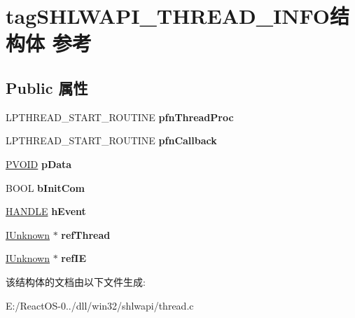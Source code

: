 \hypertarget{structtag_s_h_l_w_a_p_i___t_h_r_e_a_d___i_n_f_o}{}\section{tag\+S\+H\+L\+W\+A\+P\+I\+\_\+\+T\+H\+R\+E\+A\+D\+\_\+\+I\+N\+F\+O结构体 参考}
\label{structtag_s_h_l_w_a_p_i___t_h_r_e_a_d___i_n_f_o}
\subsection*{Public 属性}
\begin{DoxyCompactItemize}
\item 
\mbox{\label{structtag_s_h_l_w_a_p_i___t_h_r_e_a_d___i_n_f_o_a1efacbeb69d12b0a4964fd877233ce87}} 
L\+P\+T\+H\+R\+E\+A\+D\+\_\+\+S\+T\+A\+R\+T\+\_\+\+R\+O\+U\+T\+I\+NE {\bfseries pfn\+Thread\+Proc}
\item 
\mbox{\label{structtag_s_h_l_w_a_p_i___t_h_r_e_a_d___i_n_f_o_adb1f887bf04e0d3e54d162e7953a323a}} 
L\+P\+T\+H\+R\+E\+A\+D\+\_\+\+S\+T\+A\+R\+T\+\_\+\+R\+O\+U\+T\+I\+NE {\bfseries pfn\+Callback}
\item 
\mbox{\label{structtag_s_h_l_w_a_p_i___t_h_r_e_a_d___i_n_f_o_a054a5a58a725cf9ab3c73cfe1911ccde}} 
\hyperlink{interfacevoid}{P\+V\+O\+ID} {\bfseries p\+Data}
\item 
\mbox{\label{structtag_s_h_l_w_a_p_i___t_h_r_e_a_d___i_n_f_o_ad0e8c725fe8103f292b5441796ca9ae1}} 
B\+O\+OL {\bfseries b\+Init\+Com}
\item 
\mbox{\label{structtag_s_h_l_w_a_p_i___t_h_r_e_a_d___i_n_f_o_ad8558a5cdac6f5ac2d8eedb75895f2c3}} 
\hyperlink{interfacevoid}{H\+A\+N\+D\+LE} {\bfseries h\+Event}
\item 
\mbox{\label{structtag_s_h_l_w_a_p_i___t_h_r_e_a_d___i_n_f_o_a1728524513871cd41ce92f7a8a116c9e}} 
\hyperlink{interface_i_unknown}{I\+Unknown} $\ast$ {\bfseries ref\+Thread}
\item 
\mbox{\label{structtag_s_h_l_w_a_p_i___t_h_r_e_a_d___i_n_f_o_af4414a23000a43213f52c92d43dbdecb}} 
\hyperlink{interface_i_unknown}{I\+Unknown} $\ast$ {\bfseries ref\+IE}
\end{DoxyCompactItemize}


该结构体的文档由以下文件生成\+:\begin{DoxyCompactItemize}
\item 
E\+:/\+React\+O\+S-\/0../dll/win32/shlwapi/thread.\+c\end{DoxyCompactItemize}

